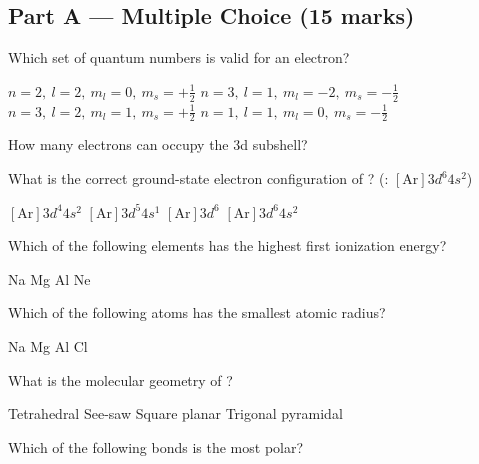 \documentclass[addpoints]{exam}
\begin{document}
\newpage
\begin{questions}

\section*{Part A --- Multiple Choice (15 marks)}
\vspace{5mm}

\question[1] Which set of quantum numbers is valid for an electron?
\begin{choices}
    \choice $n=2,\ l=2,\ m_l=0,\ m_s=+\tfrac{1}{2}$
    \choice $n=3,\ l=1,\ m_l=-2,\ m_s=-\tfrac{1}{2}$
    \correctchoice $n=3,\ l=2,\ m_l=1,\ m_s=+\tfrac{1}{2}$
    \choice $n=1,\ l=1,\ m_l=0,\ m_s=-\tfrac{1}{2}$
\end{choices}

\question[1] How many electrons can occupy the 3d subshell?
\begin{choices}
\end{choices}

\question[1] What is the correct ground-state electron configuration of ?
(: $[\text{Ar}]3d^6 4s^2$)
\begin{choices}
    \choice $[\text{Ar}]3d^4 4s^2$
    \choice $[\text{Ar}]3d^5 4s^1$
    \correctchoice $[\text{Ar}]3d^6$
    \choice $[\text{Ar}]3d^6 4s^2$
\end{choices}

\question[1] Which of the following elements has the highest first ionization energy?
\begin{choices}
    \choice Na
    \choice Mg
    \choice Al
    \correctchoice Ne
\end{choices}

\question[1] Which of the following atoms has the smallest atomic radius?
\begin{choices}
    \choice Na
    \choice Mg
    \choice Al
    \correctchoice Cl
\end{choices}

\question[1] What is the molecular geometry of ?
\begin{choices}
    \choice Tetrahedral
    \correctchoice See-saw
    \choice Square planar
    \choice Trigonal pyramidal
\end{choices}

\question[1] Which of the following bonds is the most polar?
\begin{choices}
    \choice {}
    \choice {}
    \choice {}
    \correctchoice {}
\end{choices}


\end{questions}
\end{document}
